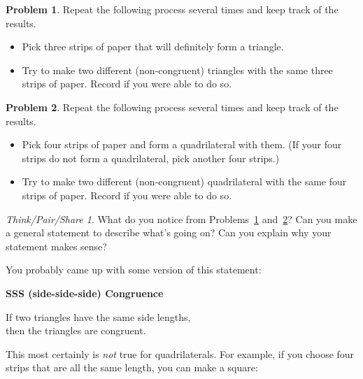 \documentclass[12pt, reqno]{amsart}
\theoremstyle{remark}
\newtheorem*{thinkpair*}{Think/Pair/Share}
\theoremstyle{definition}
\newtheorem{problem}{Problem}
\numberwithin{equation}{section}  %
\begin{document}
\begin{problem}\label{prob: SSS}
Repeat the following process several times and keep track of the results.
\begin{itemize}
\item
Pick three  strips of paper that will definitely form a triangle. \\
\item
Try to make two different (non-congruent) triangles with the same three strips of paper.  Record if you were able to do so.
\end{itemize}
\end{problem}

\bigskip

\begin{problem}\label{prob: noSSSS}
Repeat the following process several times and keep track of the results.
\begin{itemize}
\item
Pick four  strips of paper and form a quadrilateral with them.  (If your four strips do not form a quadrilateral, pick another four strips.)\\ 
\item
Try to make two different (non-congruent) quadrilateral with the same four strips of paper.  Record if you were able to do so.
\end{itemize}
\end{problem}


\bigskip
\bigskip

\begin{thinkpair*}
What do you notice from Problems~\ref{prob: SSS} and~\ref{prob: noSSSS}?  Can you make a general statement to describe what's going on?  Can you explain why your statement makes sense?
\end{thinkpair*}

\newpage

You probably came up with some version of this statement:
\begin{center}
{\bf SSS (side-side-side) Congruence}

If two triangles have the same side lengths,\\
then the triangles are congruent.
\end{center}

\bigskip

This most certainly is \emph{not} true for quadrilaterals.  For example, if you choose four strips that are all the same length, you can make a square:
\end{document}
